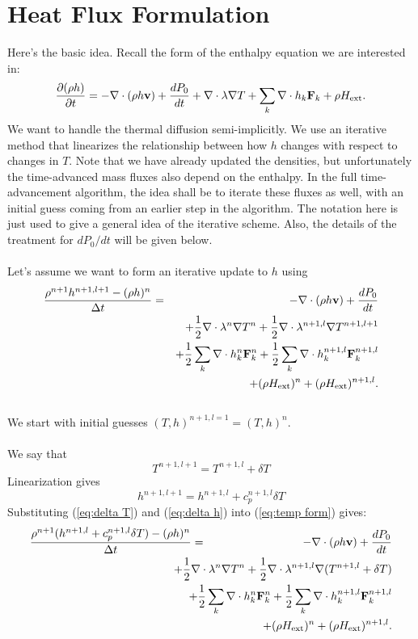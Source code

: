 \documentclass[final]{siamltex}
\def\Fb {{\bf F}}
\def\vb {{\bf v}}
\def\Hext {H_{\rm ext}}
\def\half   {\frac{1}{2}}
\begin{document}
\section{Heat Flux Formulation}
Here's the basic idea.  Recall the form of the enthalpy equation we are interested in:
\begin{equation}
\frac{\partial(\rho h)}{\partial t} = -\nabla\cdot(\rho h\vb) + \frac{dP_0}{dt} + \nabla\cdot\lambda\nabla T + \sum_k\nabla\cdot h_k\Fb_k + \rho\Hext.
\end{equation}
We want to handle the thermal diffusion semi-implicitly.  We use an iterative method that
linearizes the relationship between how $h$ changes with respect to changes in $T$.
Note that we have already updated the densities, but unfortunately the time-advanced
mass fluxes also depend on the enthalpy.  In the full time-advancement algorithm,
the idea shall be to iterate these fluxes as well, with an initial guess coming from
an earlier step in the algorithm.  The notation here is just used to give a general
idea of the iterative scheme.  Also, the details of the treatment for 
$dP_0/dt$ will be given below.\\ \\
Let's assume we want to form an iterative update to $h$ using
\begin{eqnarray}
\frac{\rho^{n+1}h^{n+1,l+1} - (\rho h)^n}{\Delta t} &=& -\nabla\cdot(\rho h\vb) + \frac{dP_0}{dt}\nonumber\\
&&+ \half\nabla\cdot\lambda^n\nabla T^n + \half\nabla\cdot\lambda^{n+1,l}\nabla T^{n+1,l+1}\nonumber\\
&& + \half\sum_k\nabla\cdot h_k^n \Fb_k^n + \half\sum_k\nabla\cdot h_k^{n+1,l}\Fb_k^{n+1,l}\nonumber\\
&& + (\rho\Hext)^n + (\rho\Hext)^{n+1,l}.\label{eq:temp form}
\end{eqnarray}
\\
We start with initial guesses $(T,h)^{n+1,l=1} = (T,h)^n$.\\ \\
We say that
\begin{equation}
T^{n+1,l+1} = T^{n+1,l} + \delta T\label{eq:delta T}
\end{equation}
Linearization gives
\begin{equation}
h^{n+1,l+1} = h^{n+1,l} + c_p^{n+1,l}\delta T\label{eq:delta h}
\end{equation}
Substituting (\ref{eq:delta T}) and (\ref{eq:delta h}) into (\ref{eq:temp form}) gives:
\begin{eqnarray}
\frac{\rho^{n+1}(h^{n+1,l} + c_p^{n+1,l}\delta T) - (\rho h)^n}{\Delta t} &=& -\nabla\cdot(\rho h\vb) + \frac{dP_0}{dt}\nonumber\\
&&\hspace{-0.5in}+ \half\nabla\cdot\lambda^n\nabla T^n + \half\nabla\cdot\lambda^{n+1,l}\nabla(T^{n+1,l} + \delta T)\nonumber\\
&&\hspace{-0.5in} + \half\sum_k\nabla\cdot h_k^n \Fb_k^n + \half\sum_k\nabla\cdot h_k^{n+1,l} \Fb_k^{n+1,l}\nonumber\\
&&\hspace{-0.5in} + (\rho\Hext)^n + (\rho\Hext)^{n+1,l}.
\end{eqnarray}
\end{document}
